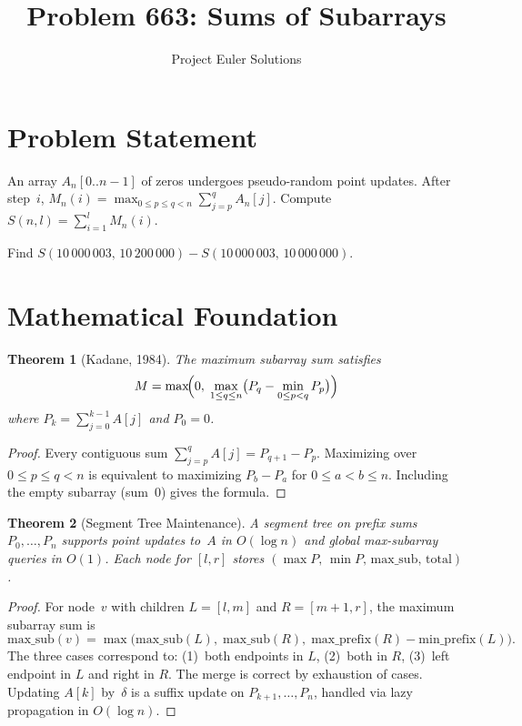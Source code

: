 \documentclass[11pt]{article}
\title{Problem 663: Sums of Subarrays}
\author{Project Euler Solutions}
\date{}
\newtheorem{theorem}{Theorem}
\begin{document}
\maketitle

\section{Problem Statement}

An array $A_n[0..n-1]$ of zeros undergoes pseudo-random point updates. After step~$i$, $M_n(i) = \max_{0\le p\le q<n}\sum_{j=p}^{q}A_n[j]$. Compute $S(n,l)=\sum_{i=1}^{l}M_n(i)$.

Find $S(10\,000\,003,\,10\,200\,000) - S(10\,000\,003,\,10\,000\,000)$.

\section{Mathematical Foundation}

\begin{theorem}[Kadane, 1984]
The maximum subarray sum satisfies
\[
M = \max\!\Bigl(0,\;\max_{1\le q\le n}\bigl(P_q - \min_{0\le p<q}P_p\bigr)\Bigr)
\]
where $P_k = \sum_{j=0}^{k-1}A[j]$ and $P_0=0$.
\end{theorem}

\begin{proof}
Every contiguous sum $\sum_{j=p}^{q}A[j] = P_{q+1}-P_p$. Maximizing over $0\le p\le q<n$ is equivalent to maximizing $P_b - P_a$ for $0\le a<b\le n$. Including the empty subarray (sum~$0$) gives the formula.
\end{proof}

\begin{theorem}[Segment Tree Maintenance]
\label{thm:segtree}
A segment tree on prefix sums $P_0,\ldots,P_n$ supports point updates to~$A$ in $O(\log n)$ and global max-subarray queries in $O(1)$. Each node for $[l,r]$ stores $(\max P,\,\min P,\,\mathrm{max\_sub},\,\mathrm{total})$.
\end{theorem}

\begin{proof}
For node~$v$ with children $L=[l,m]$ and $R=[m{+}1,r]$, the maximum subarray sum is
\[
\mathrm{max\_sub}(v) = \max\bigl(\mathrm{max\_sub}(L),\;\mathrm{max\_sub}(R),\;\mathrm{max\_prefix}(R)-\mathrm{min\_prefix}(L)\bigr).
\]
The three cases correspond to: (1)~both endpoints in $L$, (2)~both in $R$, (3)~left endpoint in $L$ and right in $R$. The merge is correct by exhaustion of cases. Updating $A[k]$ by~$\delta$ is a suffix update on $P_{k+1},\ldots,P_n$, handled via lazy propagation in $O(\log n)$.
\end{proof}
\end{document}
